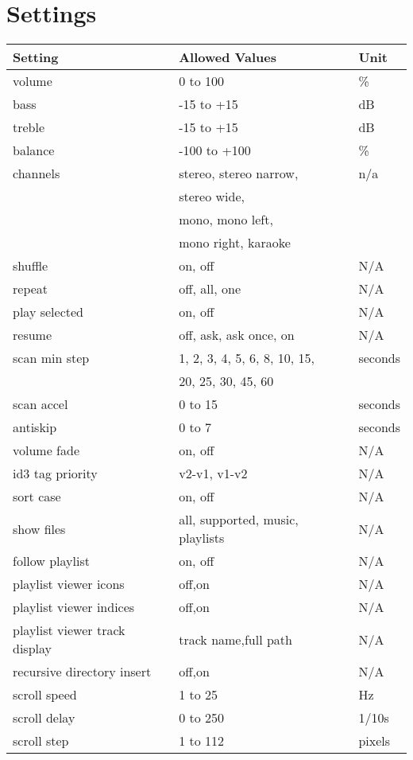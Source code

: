 \section{Settings}
\begin{center}
  \begin{longtable}{@{}lll@{}}\toprule
    \textbf{Setting} & \textbf{Allowed Values} & \textbf{Unit}\\\midrule
    volume & 0 to 100 & \%\\
    bass & -15 to +15 & dB\\
    treble & -15 to +15 &dB\\
    balance & -100 to +100 & \%\\
    channels & stereo, stereo narrow, & n/a\\
             & stereo wide, & \\
             & mono, mono left, & \\ 
             & mono right, karaoke & \\
    shuffle & on, off & N/A\\
    repeat & off, all, one & N/A\\
    play selected & on, off & N/A\\
    resume & off, ask, ask once, on & N/A\\
    scan min step & 1, 2, 3, 4, 5, 6, 8, 10, 15, & seconds\\
                  & 20, 25, 30, 45, 60 &\\
    scan accel & 0 to 15 & seconds\\
    antiskip & 0 to 7 & seconds\\
    volume fade & on, off & N/A\\
    id3 tag priority & v2-v1, v1-v2 & N/A\\
    sort case & on, off & N/A\\
    show files & all, supported, music, playlists & N/A\\
    follow playlist & on, off & N/A\\
    playlist viewer icons & off,on & N/A\\
    playlist viewer indices & off,on & N/A\\
    playlist viewer track display & track name,full path & N/A\\
    recursive directory insert & off,on & N/A\\
    scroll speed & 1 to 25 & Hz\\
    scroll delay & 0 to 250 & 1/10s\\
    scroll step & 1 to 112 & pixels\\

\end{longtable}
\end{center}
